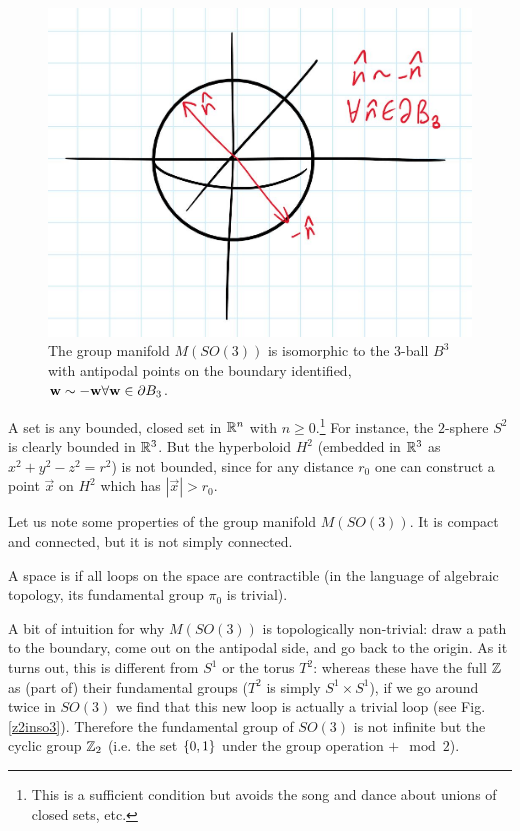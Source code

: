 \begin{figure}\label{so3manifold}
\includegraphics[scale=0.7]{2018/10/20181009_img1}
\caption{The group manifold $M(SO(3))$ is isomorphic to the 3-ball $B^3$ with antipodal points on the boundary identified, $\boldsymbol{\mathbf{w}} \sim -\boldsymbol{\mathbf{w}} \forall \boldsymbol{\mathbf{w}} \in \partial B_3$.}
\end{figure}

\begin{defn}
A  set is any bounded, closed set in $\mathbb{R}^n$ with $n\geq 0$.\footnote{This is a sufficient condition but avoids the song and dance about unions of closed sets, etc.} For instance, the $2$-sphere $S^2$ is clearly bounded in $\mathbb{R}^3$. But the hyperboloid $H^2$ (embedded in $\mathbb{R}^3$ as $x^2+y^2-z^2 =r^2$) is not bounded, since for any distance $r_0$ one can construct a point $\vec{x}$ on $H^2$ which has $|\vec{x}|>r_0$.
\end{defn}

Let us note some properties of the group manifold $M(SO(3))$. It is compact and connected, but it is not simply connected.
\begin{defn}
A space is  if all loops on the space are contractible (in the language of algebraic topology, its fundamental group $\pi_0$ is trivial).
\end{defn}
A bit of intuition for why $M(SO(3))$ is topologically non-trivial: draw a path to the boundary, come out on the antipodal side, and go back to the origin. As it turns out, this is different from $S^1$ or the torus $T^2$: whereas these have the full $\mathbb{Z}$ as (part of) their fundamental groups ($T^2$ is simply $S^1\times S^1$), if we go around twice in $SO(3)$ we find that this new loop is actually a trivial loop (see Fig. \ref{z2inso3}). Therefore the fundamental group of $SO(3)$ is not infinite but the cyclic group $\mathbb{Z}_2$ (i.e. the set $\{0,1\}$ under the group operation $+\mod 2$).

